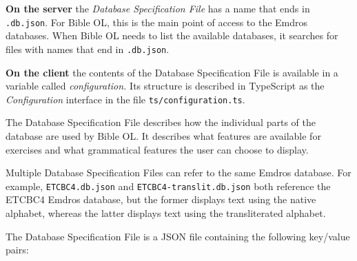 \documentclass[11pt,oneside,a4paper]{memoir}
\begin{document}
\textbf{On the server} the \emph{Database Specification File} has a name that ends in \texttt{.db.json}. For Bible OL,
this is the main point of access to the Emdros databases. When Bible OL needs to list the available
databases, it searches for files with names that end in \texttt{.db.json}.

\textbf{On the client} the contents of the Database Specification File is available in a variable
called \emph{configuration.} Its structure is described in TypeScript as the \emph{Configuration}
interface in the file \texttt{ts/configuration.ts}.

The Database Specification File describes how the individual parts of the database are used by Bible
OL. It describes what features are available for exercises and what grammatical features the user
can choose to display.

Multiple Database Specification Files can refer to the same Emdros database. For example,
\texttt{ETCBC4.db.json} and \texttt{ETCBC4-translit.db.json} both reference the ETCBC4 Emdros
database, but the former displays text using the native alphabet, whereas the latter displays text
using the transliterated alphabet.

The Database Specification File is a JSON file containing the following key/value pairs:
\end{document}
